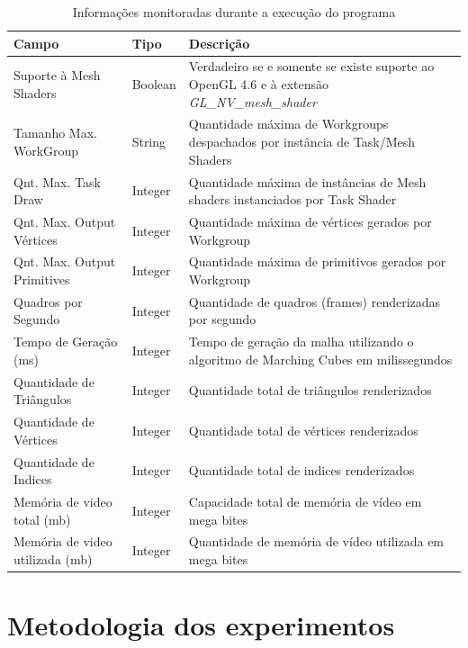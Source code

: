 \begin{center}
\begin{table}
\begin{tabular}{|m{10em} | m{4em} | m{19em} |} 
 \hline
 Campo & Tipo & Descrição  \\
 \hline
Suporte à Mesh Shaders & Boolean & Verdadeiro se e somente se existe suporte ao OpenGL 4.6 e à extensão \textit{GL\_NV\_mesh\_shader} \\ \hline
Tamanho Max. WorkGroup & String & Quantidade máxima de Workgroups despachados por instância de Task/Mesh Shaders  \\ \hline
Qnt. Max. Task Draw & Integer & Quantidade máxima de instâncias de Mesh shaders instanciados por Task Shader   \\  \hline
Qnt. Max. Output Vértices & Integer & Quantidade máxima de vértices gerados por Workgroup \\  \hline
Qnt. Max. Output Primitives & Integer & Quantidade máxima de primitivos gerados por Workgroup \\  \hline
Quadros por Segundo & Integer & Quantidade de quadros (frames) renderizadas por segundo \\  \hline
Tempo de Geração (ms) & Integer & Tempo de geração da malha utilizando o algoritmo de Marching Cubes em milissegundos \\  \hline
Quantidade de Triângulos & Integer & Quantidade total de triângulos renderizados \\  \hline
Quantidade de Vértices & Integer & Quantidade total de vértices renderizados \\  \hline
Quantidade de Indices & Integer & Quantidade total de indices renderizados \\  \hline
Memória de video total (mb) & Integer & Capacidade total de memória de vídeo em mega bites \\  \hline
Memória de video utilizada (mb) & Integer & Quantidade de memória de vídeo utilizada em mega bites \\  \hline

\end{tabular}
\caption{Informações monitoradas durante a execução do programa}
\label{TBL:DESCRICAO_INFO_FERRAMENTA}
\end{table}
\end{center}

\section{Metodologia dos experimentos}\label{sec:LABEL_AMBIENTE_EXPERIMENTOS}

